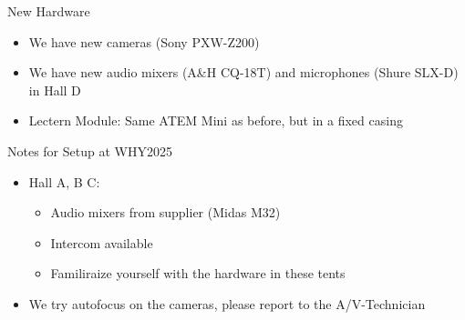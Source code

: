 
\begin{frame}{New Hardware}
	\begin{itemize}
		\item We have new cameras (Sony PXW-Z200)
		\item We have new audio mixers (A\&H CQ-18T) and microphones (Shure SLX-D) in Hall D
		\item Lectern Module: Same ATEM Mini as before, but in a fixed casing
	\end{itemize}
\end{frame}

\begin{frame}{Notes for Setup at WHY2025}
	\begin{itemize}
		\item Hall A, B C:
		\begin{itemize}
			\item Audio mixers from supplier (Midas M32)
			\item Intercom available
			\item Familiraize yourself with the hardware in these tents
		\end{itemize}
		\item We try autofocus on the cameras, please report to the A/V-Technician
	\end{itemize}
\end{frame}
